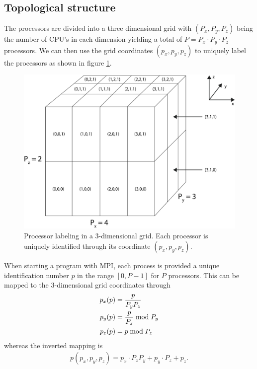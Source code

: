 \subsection{Topological structure}
The processors are divided into a three dimensional grid with $(P_x, P_y, P_z)$ being the number of CPU's in each dimension yielding a total of $P = P_x\cdot P_y\cdot P_z$ processors. We can then use the grid coordinates $(p_x, p_y, p_z)$ to uniquely label the processors as shown in figure \ref{fig:dsmc_parallelization_2}.
\begin{figure}[h]
\begin{center}
\includegraphics[width=\textwidth, trim=0cm 0cm 0cm 0cm, clip]{DSMC/figures/parallelization_node_configuration.eps}
\end{center}
\caption{Processor labeling in a 3-dimensional grid. Each processor is uniquely identified through its coordinate $(p_x, p_y, p_z)$.}
\label{fig:dsmc_parallelization_2}
\end{figure}
When starting a program with MPI, each process is provided a unique identification number $p$ in the range $[0, P-1]$ for $P$ processors. This can be mapped to the 3-dimensional grid coordinates through
\begin{align}
	\nonumber
	p_x(p) &= {p \over P_yP_z}\\
	\nonumber
	p_y(p) &= {p \over P_z} \bmod P_y\\
	p_z(p) &= p \bmod P_z
\end{align}
whereas the inverted mapping is 
\begin{align}
	p(p_x, p_y, p_z) = p_x\cdot P_zP_y + p_y\cdot P_z + p_z.
\end{align}

